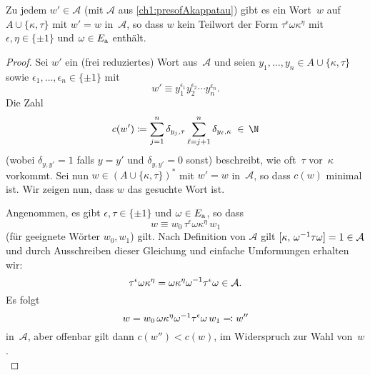 \begin{thLemma}\label{ch1:wordsinAkappatau}
    Zu jedem $w'\in\mathcal A$ (mit $\mathcal A$ aus
    \cref{ch1:presofAkappatau}) gibt es ein Wort~$w$ auf
    $A\cup\{\kappa,\tau\}$ mit $w'=w$ in~$\mathcal A$,
    so dass $w$ kein Teilwort der Form $\tau^\epsilon\omega\kappa^\eta$
    mit $\epsilon,\eta\in\{\pm1\}$ und $\omega\in E_{\mathrm a}$ enthält.
\end{thLemma}
%
\begin{proof}
    Sei $w'$ ein (frei reduziertes) Wort aus~$\mathcal A$
    und seien $y_1,\dots,y_n\in A\cup\{\kappa,\tau\}$ sowie
    $\epsilon_1,\dots,\epsilon_n\in\{\pm1\}$
    mit
    \[ w' \equiv
        y_1^{\epsilon_1}y_2^{\epsilon_2}\cdots y_n^{\epsilon_n}
    . \]
    Die Zahl
    \[ c(w') \defeq \sum_{j=1}^n \delta_{y_j,\tau}
                        \sum_{\ell=j+1}^n \delta_{y_\ell,\kappa}
        \;\in\,\N
    \]
    (wobei $\delta_{y,y'} = 1$ falls $y=y'$ und $\delta_{y,y'} = 0$ sonst)
    beschreibt, wie oft~$\tau$ vor~$\kappa$ vorkommt.
    Sei nun $w\in (A\cup\{\kappa,\tau\})^*$ mit $w'=w$ in~$\mathcal A$,
    so dass $c(w)$ minimal ist. Wir zeigen nun, dass $w$ das gesuchte
    Wort ist.
    
    Angenommen, es gibt $\epsilon,\tau\in\{\pm1\}$ und $\omega\in E_{\mathrm a}$,
    so dass
    \[ w \equiv w_0 \, \tau^\epsilon\omega\kappa^\eta \, w_1 \]
    (für geeignete Wörter $w_0,w_1$) gilt. Nach Definition
    von $\mathcal A$ gilt $\cu[\kappa, \omega\inv\tau\omega] = 1
    \in\mathcal A$ und durch Ausschreiben dieser Gleichung und einfache
    Umformungen erhalten wir:
    \[ \tau^\epsilon\omega\kappa^\eta
        = \omega\kappa^\eta\omega^{-1}\tau^\epsilon\omega
        \in\mathcal A
    . \]
    Es folgt
    \[ w = w_0 \, \omega\kappa^\eta\omega^{-1}\tau^\epsilon\omega \, w_1
        \eqqcolon w''
    \]
    in~$\mathcal A$, aber offenbar gilt dann $c(w'') < c(w)$, im
    Widerspruch zur Wahl von~$w$.
    \\
\end{proof}

